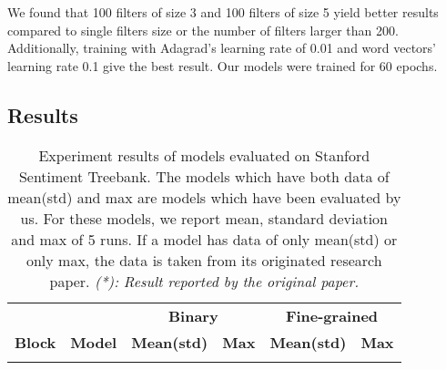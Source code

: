 We found that 100 filters of size 3 and 100 filters of size 5 yield better results compared to single filters size or the number of filters larger than 200. 
Additionally, training with Adagrad's learning rate of 0.01 and word vectors' learning rate 0.1 give the best result. 
Our models were trained for 60 epochs.
\subsection{Results}
\begin{table*}[]
	\centering
	\caption[Experiment result on SST]{Experiment results of models evaluated on Stanford Sentiment Treebank.
		The models which have both data of mean(std) and max are models which have been evaluated by us.
		For these models, we report mean, standard deviation and max of 5 runs.
		If a model has data of only mean(std) or only max, the data is taken from its originated research paper.
		\textit{(*): Result reported by the original paper.}}
	\label{table:experimentresult}
	\begin{tabular}{|c|l|ll|ll|}
		\hline
		   ~ & ~  & \multicolumn{2}{c|}{\textbf{Binary}} & \multicolumn{2}{c|}{\textbf{Fine-grained}}  \\
		\cline{3-6}
		\textbf{Block}    & \textbf{Model}  & \textbf{Mean(std)} & \textbf{Max} & \textbf{Mean(std)} & \textbf{Max}  \\
		\Xhline{3\arrayrulewidth}
		\Xhline{3\arrayrulewidth}
		

\end{tabular}
\end{table*}
